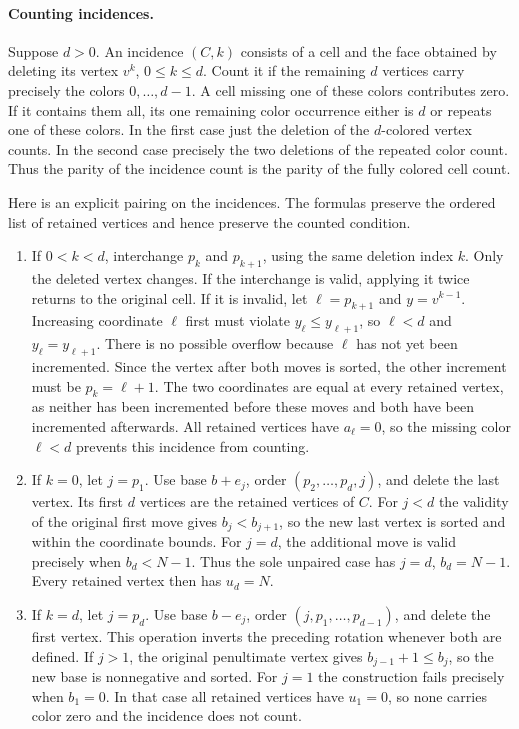 \paragraph{Counting incidences.}
Suppose $d>0$. An incidence $(C,k)$ consists of a cell and the face
obtained by deleting its vertex $v^k$, $0\leq k\leq d$. Count it if the
remaining $d$ vertices carry precisely the colors $0,\ldots,d-1$.
A cell missing one of these colors contributes zero. If it contains
them all, its one remaining color occurrence either is $d$ or repeats
one of these colors. In the first case just the deletion of the
$d$-colored vertex counts. In the second case precisely the two
deletions of the repeated color count. Thus the parity of the incidence
count is the parity of the fully colored cell count.

Here is an explicit pairing on the incidences. The formulas preserve
the ordered list of retained vertices and hence preserve the counted
condition.
\begin{enumerate}
\item If $0<k<d$, interchange $p_k$ and $p_{k+1}$, using the same
deletion index $k$. Only the deleted vertex changes. If the interchange
is valid, applying it twice returns to the original cell. If it is
invalid, let $\ell=p_{k+1}$ and $y=v^{k-1}$. Increasing coordinate
$\ell$ first must violate $y_\ell\leq y_{\ell+1}$, so $\ell<d$ and
$y_\ell=y_{\ell+1}$. There is no possible overflow because $\ell$
has not yet been incremented. Since the vertex after both moves is
sorted, the other increment must be $p_k=\ell+1$. The two coordinates
are equal at every retained vertex, as neither has been incremented
before these moves and both have been incremented afterwards. All
retained vertices have $a_\ell=0$, so the missing color $\ell<d$
prevents this incidence from counting.
\item If $k=0$, let $j=p_1$. Use base $b+e_j$, order
$(p_2,\ldots,p_d,j)$, and delete the last vertex. Its first $d$ vertices
are the retained vertices of $C$. For $j<d$ the validity of the
original first move gives $b_j<b_{j+1}$, so the new last vertex is
sorted and within the coordinate bounds. For $j=d$, the additional
move is valid precisely when $b_d<N-1$. Thus the sole unpaired case
has $j=d$, $b_d=N-1$. Every retained vertex then has $u_d=N$.
\item If $k=d$, let $j=p_d$. Use base $b-e_j$, order
$(j,p_1,\ldots,p_{d-1})$, and delete the first vertex. This operation
inverts the preceding rotation whenever both are defined. If $j>1$,
the original penultimate vertex gives $b_{j-1}+1\leq b_j$, so the new
base is nonnegative and sorted. For $j=1$ the construction fails
precisely when $b_1=0$. In that case all retained vertices have
$u_1=0$, so none carries color zero and the incidence does not count.
\end{enumerate}

